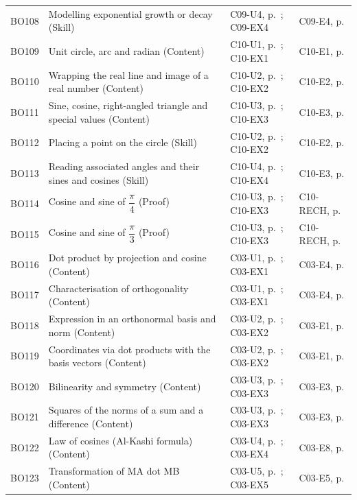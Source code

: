 \begin{longtable}{p{.1\linewidth}p{.43\linewidth}p{.19\linewidth}p{.16\linewidth}}
BO108 & Modelling exponential growth or decay (Skill) & C09-U4, p.\,\pageref{C09-U4} ; C09-EX4 & C09-E4, p.\,\pageref{C09-E4} \\
BO109 & Unit circle, arc and radian (Content) & C10-U1, p.\,\pageref{C10-U1} ; C10-EX1 & C10-E1, p.\,\pageref{C10-E1} \\
BO110 & Wrapping the real line and image of a real number (Content) & C10-U2, p.\,\pageref{C10-U2} ; C10-EX2 & C10-E2, p.\,\pageref{C10-E2} \\
BO111 & Sine, cosine, right-angled triangle and special values (Content) & C10-U3, p.\,\pageref{C10-U3} ; C10-EX3 & C10-E3, p.\,\pageref{C10-E3} \\
BO112 & Placing a point on the circle (Skill) & C10-U2, p.\,\pageref{C10-U2} ; C10-EX2 & C10-E2, p.\,\pageref{C10-E2} \\
BO113 & Reading associated angles and their sines and cosines (Skill) & C10-U4, p.\,\pageref{C10-U4} ; C10-EX4 & C10-E3, p.\,\pageref{C10-E3} \\
BO114 & Cosine and sine of $\dfrac{\pi}{4}$ (Proof) & C10-U3, p.\,\pageref{C10-U3} ; C10-EX3 & C10-RECH, p.\,\pageref{C10-RECH} \\
BO115 & Cosine and sine of $\dfrac{\pi}{3}$ (Proof) & C10-U3, p.\,\pageref{C10-U3} ; C10-EX3 & C10-RECH, p.\,\pageref{C10-RECH} \\
BO116 & Dot product by projection and cosine (Content) & C03-U1, p.\,\pageref{C03-U1} ; C03-EX1 & C03-E4, p.\,\pageref{C03-E4} \\
BO117 & Characterisation of orthogonality (Content) & C03-U1, p.\,\pageref{C03-U1} ; C03-EX1 & C03-E4, p.\,\pageref{C03-E4} \\
BO118 & Expression in an orthonormal basis and norm (Content) & C03-U2, p.\,\pageref{C03-U2} ; C03-EX2 & C03-E1, p.\,\pageref{C03-E1} \\
BO119 & Coordinates via dot products with the basis vectors (Content) & C03-U2, p.\,\pageref{C03-U2} ; C03-EX2 & C03-E1, p.\,\pageref{C03-E1} \\
BO120 & Bilinearity and symmetry (Content) & C03-U3, p.\,\pageref{C03-U3} ; C03-EX3 & C03-E3, p.\,\pageref{C03-E3} \\
BO121 & Squares of the norms of a sum and a difference (Content) & C03-U3, p.\,\pageref{C03-U3} ; C03-EX3 & C03-E3, p.\,\pageref{C03-E3} \\
BO122 & Law of cosines (Al-Kashi formula) (Content) & C03-U4, p.\,\pageref{C03-U4} ; C03-EX4 & C03-E8, p.\,\pageref{C03-E8} \\
BO123 & Transformation of MA dot MB (Content) & C03-U5, p.\,\pageref{C03-U5} ; C03-EX5 & C03-E5, p.\,\pageref{C03-E5} \\

\end{longtable}
